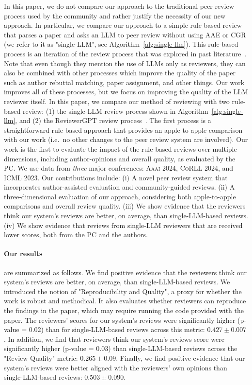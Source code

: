 \documentclass{article} %
\begin{document}
In this paper, we do not compare our approach to the traditional peer review process used by the community and rather justify the necessity of our new approach. In particular, we compare our approach to a simple rule-based review that parses a paper and asks an LLM to peer review without using AAE or CGR (we refer to it as "single-LLM", see Algorithm~\ref{alg:single-llm}). This rule-based process is an iteration of the review process that was explored in past literature~\cite{liu2023reviewergpt}. Note that even though they mention the use of LLMs only as reviewers, they can also be combined with other processes which improve the quality of the paper such as author rebuttal matching, paper assignment, and other things. Our work improves all of these processes, but we focus on improving the quality of the LLM reviewer itself. 
In this paper, we compare our method of reviewing with two rule-based review: (1) the single-LLM review process shown in Algorithm~\ref{alg:single-llm}, and (2) the ReviewerGPT review process~\citep{liu2023reviewergpt}. The first process is a straightforward rule-based approach that provides an apple-to-apple comparison with our work (i.e.\ no other changes to the peer review system are involved). Our work is the first to evaluate the impact of the rule-based reviews over multiple dimensions, including author-opinions and overall quality, as evaluated by the PC. We use data from \textit{three} major conferences: \textsc{Aaai 2024}, \textsc{CoRLL 2024}, and \textsc{ICML 2023}.
Our contributions include: (i) A novel peer review system that incorporates author-assisted evaluation and community-guided reviews. (ii) A three-dimensional evaluation of our approach, considering both apple-to-apple comparisons and overall review quality. (iii) We show evidence that the reviewers think our system's reviews are better, on average, than single-LLM-based reviews. (iv) We show evidence that reviews from single-LLM reviewers that are received lower scores, both from the PC and the authors.

\paragraph{Our results} are summarized as follows. 
We find positive evidence that the reviewers think our system's reviews are better, on average, than single-LLM-based reviews.
We introduced the notion of "Reproducibility and Quality", a proxy for whether the work is robust and methodical.
It also evaluates whether reviewers can reproduce the findings in the paper, which may require running the code provided with the paper.
The reviewers' scores for our system's reviews were significantly higher (p-value = 0.02) than for single-LLM-based reviews across this metric: $0.427 \pm 0.007$.
In addition, we find that reviewers think our system's reviews score were significantly higher (p-value = 0.03) than single-LLM-based reviews across the "Review Quality" metric: $0.265 \pm 0.09$.
Finally, we find positive evidence that our system's reviews were better aligned with the reviewers' own opinions than single-LLM-based reviews: $0.503 \pm 0.090$.
\end{document}
